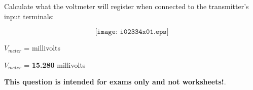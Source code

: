 

Calculate what the voltmeter will register when connected to the transmitter's input terminals:

$$\texttt{[image: i02334x01.eps]}$$

$V_{meter}$ = \underbar{\hskip 50pt} millivolts







$V_{meter}$ = {\bf 15.280} millivolts







{\bf This question is intended for exams only and not worksheets!}.


